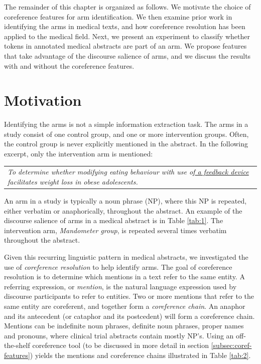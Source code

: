 The remainder of this chapter is organized as follows. We motivate the choice of coreference features for arm identification. We then examine prior work in identifying the arms in medical texts, and how coreference resolution has been applied to the medical field. Next, we present an experiment to classify whether tokens in annotated medical abstracts are part of an arm. We propose features that take advantage of the discourse salience of arms, and we discuss the results with and without the coreference features.

\section{Motivation}
Identifying the arms is not a simple information extraction task. The arms in a study consist of one control group, and one or more intervention groups. Often, the control group is never explicitly mentioned in the abstract. In the following excerpt, only the intervention arm is mentioned:
\vspace{-.5em}

\begin{table}[H] 
\begin{tabular}{p{7cm}}
\small{\textit{To determine whether modifying eating behaviour with use of\uline{ a feedback device} facilitates weight loss in obese adolescents.}}
\end{tabular}
\end{table}
\vspace{-1.2em}
An arm in a study is typically a noun phrase (NP), where this NP is repeated, either verbatim or anaphorically, throughout the abstract. An example of the discourse salience of arms in a medical abstract is in Table \ref{tab:1}. The intervention arm, \textit{Mandometer group}, is repeated several times verbatim throughout the abstract.

Given this recurring linguistic pattern in medical abstracts, we investigated the use of \textit{coreference resolution} to help identify arms. The goal of coreference resolution is to determine which mentions in a text refer to the same entity. A referring expression, or \textit{mention}, is the natural language expression used by discourse participants to refer to entities. Two or more mentions that refer to the same entity are coreferent, and together form a \textit{coreference chain}. An anaphor and its antecedent (or cataphor and its postcedent) will form a coreference chain. Mentions can be indefinite noun phrases, definite noun phrases, proper names and pronouns, where clinical trial abstracts contain mostly NP's. Using an off-the-shelf coreference tool (to be discussed in more detail in section \ref{subsec:coref-features}) yields the mentions and coreference chains illustrated in Table \ref{tab:2}.

